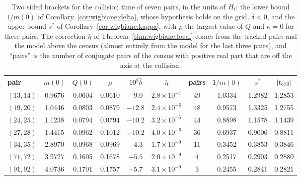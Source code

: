 \begin{table}[htbp]
\centering\footnotesize\setlength{\tabcolsep}{3.5pt}
\begin{tabular}{lccccccccc}
\toprule
pair & $m(0)$ & $Q(0)$ & $\rho$ & $10^8\bar\delta$ & $\bar\eta$ & pairs & $1/m(0)$ & $s^*$ & $|t_{\rm coll}|$\\
\midrule
$(13,14)$ & 0.9676 & 0.0604 & 0.0610 & $-9.0$ & $2.8\times10^{-7}$ & 49 & 1.0334 & 1.2982 & 1.2853\\
$(19,20)$ & 1.0446 & 0.0803 & 0.0879 & $-12.8$ & $2.4\times10^{-6}$ & 48 & 0.9573 & 1.3325 & 1.2755\\
$(24,25)$ & 1.1238 & 0.0794 & 0.0794 & $-10.2$ & $3.2\times10^{-5}$ & 44 & 0.8898 & 1.1578 & 1.1439\\
$(27,28)$ & 1.4415 & 0.0962 & 0.1012 & $-10.2$ & $4.0\times10^{-6}$ & 36 & 0.6937 & 0.9006 & 0.8811\\
$(34,35)$ & 2.8970 & 0.0968 & 0.0969 & $-4.3$ & $1.7\times10^{-9}$ & 11 & 0.3452 & 0.3853 & 0.3846\\
$(71,72)$ & 3.9727 & 0.1605 & 0.1678 & $-5.5$ & $2.0\times10^{-9}$ & 4 & 0.2517 & 0.2903 & 0.2880\\
$(91,92)$ & 4.0736 & 0.1701 & 0.1757 & $-5.7$ & $3.1\times10^{-9}$ & 3 & 0.2455 & 0.2841 & 0.2821\\
\bottomrule
\end{tabular}
\caption{Two sided brackets for the collision time of seven pairs, in the units of $H_t$: the lower bound $1/m(0)$ of Corollary~\ref{cor:wigbiane:delta}, whose hypothesis holds on the grid, $\bar\delta<0$, and the upper bound $s^*$ of Corollary~\ref{cor:wigbiane:kappa}, with $\rho$ the largest value of $Q$ and $\bar\kappa=0$ for these pairs. The correction $\bar\eta$ of Theorem~\ref{thm:wigbiane:local} comes from the tracked pairs and the model above the census (almost entirely from the model for the last three pairs), and ``pairs'' is the number of conjugate pairs of the census with positive real part that are off the axis at the collision.}
\label{tab:wigbiane:bracket}
\end{table}

